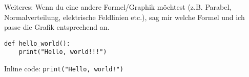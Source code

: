 \documentclass[a4paper,12pt]{article}
\begin{document}
Weiteres: Wenn du eine andere Formel/Graphik möchtest (z.B. Parabel, Normalverteilung, elektrische Feldlinien etc.), sag mir welche Formel und ich passe die Grafik entsprechend an.



\begin{verbatim}
def hello_world():
    print("Hello, world!!!")
\end{verbatim}


Inline code: \texttt{print("Hello, world!")}
\end{document}
